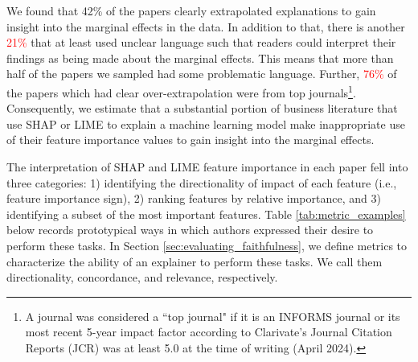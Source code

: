 \documentclass[mnsc,blindrev]{informs3}
\begin{document}
        We found that 42\% of the papers clearly extrapolated explanations to gain insight into the marginal effects in the data. In addition to that, there is another \textcolor{red}{21\%} that at least used unclear language such that readers could interpret their findings as being made about the marginal effects. This means that more than half of the papers we sampled had some problematic language. Further, \textcolor{red}{76\%} of the papers which had clear over-extrapolation were from top journals\footnote{A journal was considered a ``top journal" if it is an INFORMS journal or its most recent 5-year impact factor according to Clarivate's Journal Citation Reports (JCR) was at least 5.0 at the time of writing (April 2024).}.
        Consequently, we estimate that a substantial portion of business literature that use SHAP or LIME to explain a machine learning model make inappropriate use of their feature importance values to gain insight into the marginal effects.

        The interpretation of SHAP and LIME feature importance in each paper fell into three categories: 1) identifying the directionality of impact of each feature (i.e., feature importance sign), 2) ranking features by relative importance, and 3) identifying a subset of the most important features. Table \ref{tab:metric_examples} below records prototypical ways in which authors expressed their desire to perform these tasks. In Section \ref{sec:evaluating_faithfulness}, we define metrics to characterize the ability of an explainer to perform these tasks. We call them directionality, concordance, and relevance, respectively. 
\end{document}
